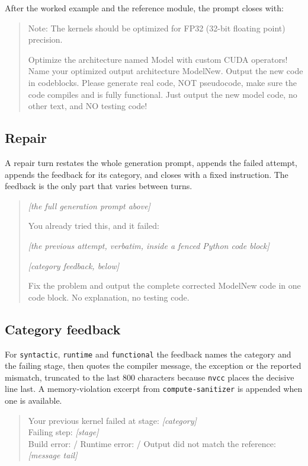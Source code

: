 \documentclass[12pt]{article}
\begin{document}
After the worked example and the reference module, the prompt closes with:

\begin{quote}\small
Note: The kernels should be optimized for FP32 (32-bit floating point)
precision.

Optimize the architecture named Model with custom CUDA operators! Name your
optimized output architecture ModelNew. Output the new code in codeblocks.
Please generate real code, NOT pseudocode, make sure the code compiles and is
fully functional. Just output the new model code, no other text, and NO testing
code!
\end{quote}

\subsection*{Repair}

A repair turn restates the whole generation prompt, appends the failed attempt,
appends the feedback for its category, and closes with a fixed instruction. The
feedback is the only part that varies between turns.

\begin{quote}\small
\textit{[the full generation prompt above]}

You already tried this, and it failed:

\textit{[the previous attempt, verbatim, inside a fenced Python code block]}

\textit{[category feedback, below]}

Fix the problem and output the complete corrected ModelNew code in one code
block. No explanation, no testing code.
\end{quote}

\subsection*{Category feedback}

For \texttt{syntactic}, \texttt{runtime} and \texttt{functional} the feedback
names the category and the failing stage, then quotes the compiler message, the
exception or the reported mismatch, truncated to the last 800 characters
because \texttt{nvcc} places the decisive line last. A memory-violation excerpt
from \texttt{compute-sanitizer} is appended when one is available.

\begin{quote}\small
Your previous kernel failed at stage: \textit{[category]}\\
Failing step: \textit{[stage]}\\
Build error: / Runtime error: / Output did not match the reference:\\
\textit{[message tail]}
\end{quote}
\end{document}
